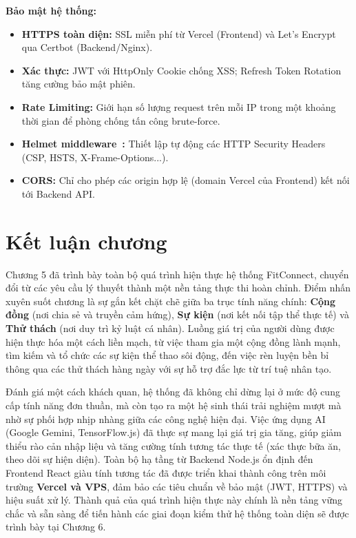 \textbf{Bảo mật hệ thống:}
\begin{itemize}
    \item \textbf{HTTPS toàn diện:} SSL miễn phí từ Vercel (Frontend) và Let's Encrypt qua Certbot (Backend/Nginx).
    \item \textbf{Xác thực:} JWT với HttpOnly Cookie chống XSS; Refresh Token Rotation tăng cường bảo mật phiên.
    \item \textbf{Rate Limiting:} Giới hạn số lượng request trên mỗi IP trong một khoảng thời gian để phòng chống tấn công brute-force.
    \item \textbf{Helmet middleware~\cite{HelmetJS}:} Thiết lập tự động các HTTP Security Headers (CSP, HSTS, X-Frame-Options...).
    \item \textbf{CORS:} Chỉ cho phép các origin hợp lệ (domain Vercel của Frontend) kết nối tới Backend API.
\end{itemize}

\section{Kết luận chương}
\label{sec:impl_conclusion}

Chương 5 đã trình bày toàn bộ quá trình hiện thực hệ thống FitConnect, chuyển đổi từ các yêu cầu lý thuyết thành một nền tảng thực thi hoàn chỉnh. Điểm nhấn xuyên suốt chương là sự gắn kết chặt chẽ giữa ba trục tính năng chính: \textbf{Cộng đồng} (nơi chia sẻ và truyền cảm hứng), \textbf{Sự kiện} (nơi kết nối tập thể thực tế) và \textbf{Thử thách} (nơi duy trì kỷ luật cá nhân). Luồng giá trị của người dùng được hiện thực hóa một cách liền mạch, từ việc tham gia một cộng đồng lành mạnh, tìm kiếm và tổ chức các sự kiện thể thao sôi động, đến việc rèn luyện bền bỉ thông qua các thử thách hàng ngày với sự hỗ trợ đắc lực từ trí tuệ nhân tạo.

Đánh giá một cách khách quan, hệ thống đã không chỉ dừng lại ở mức độ cung cấp tính năng đơn thuần, mà còn tạo ra một hệ sinh thái trải nghiệm mượt mà nhờ sự phối hợp nhịp nhàng giữa các công nghệ hiện đại. Việc ứng dụng AI (Google Gemini, TensorFlow.js) đã thực sự mang lại giá trị gia tăng, giúp giảm thiểu rào cản nhập liệu và tăng cường tính tương tác thực tế (xác thực bữa ăn, theo dõi sự hiện diện). Toàn bộ hạ tầng từ Backend Node.js ổn định đến Frontend React giàu tính tương tác đã được triển khai thành công trên môi trường \textbf{Vercel và VPS}, đảm bảo các tiêu chuẩn về bảo mật (JWT, HTTPS) và hiệu suất xử lý. Thành quả của quá trình hiện thực này chính là nền tảng vững chắc và sẵn sàng để tiến hành các giai đoạn kiểm thử hệ thống toàn diện sẽ được trình bày tại Chương 6.

